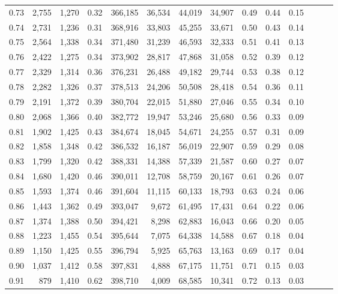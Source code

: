 \begin{tabular}{rrrrrrrrrrrrrr}
0.73 &  2,755 &  1,270 &  0.32 &  366,185 &   36,534 &  44,019 &  34,907 &  0.49 &  0.44 &      0.15 \\
0.74 &  2,731 &  1,236 &  0.31 &  368,916 &   33,803 &  45,255 &  33,671 &  0.50 &  0.43 &      0.14 \\
0.75 &  2,564 &  1,338 &  0.34 &  371,480 &   31,239 &  46,593 &  32,333 &  0.51 &  0.41 &      0.13 \\
0.76 &  2,422 &  1,275 &  0.34 &  373,902 &   28,817 &  47,868 &  31,058 &  0.52 &  0.39 &      0.12 \\
0.77 &  2,329 &  1,314 &  0.36 &  376,231 &   26,488 &  49,182 &  29,744 &  0.53 &  0.38 &      0.12 \\
0.78 &  2,282 &  1,326 &  0.37 &  378,513 &   24,206 &  50,508 &  28,418 &  0.54 &  0.36 &      0.11 \\
0.79 &  2,191 &  1,372 &  0.39 &  380,704 &   22,015 &  51,880 &  27,046 &  0.55 &  0.34 &      0.10 \\
0.80 &  2,068 &  1,366 &  0.40 &  382,772 &   19,947 &  53,246 &  25,680 &  0.56 &  0.33 &      0.09 \\
0.81 &  1,902 &  1,425 &  0.43 &  384,674 &   18,045 &  54,671 &  24,255 &  0.57 &  0.31 &      0.09 \\
0.82 &  1,858 &  1,348 &  0.42 &  386,532 &   16,187 &  56,019 &  22,907 &  0.59 &  0.29 &      0.08 \\
0.83 &  1,799 &  1,320 &  0.42 &  388,331 &   14,388 &  57,339 &  21,587 &  0.60 &  0.27 &      0.07 \\
0.84 &  1,680 &  1,420 &  0.46 &  390,011 &   12,708 &  58,759 &  20,167 &  0.61 &  0.26 &      0.07 \\
0.85 &  1,593 &  1,374 &  0.46 &  391,604 &   11,115 &  60,133 &  18,793 &  0.63 &  0.24 &      0.06 \\
0.86 &  1,443 &  1,362 &  0.49 &  393,047 &    9,672 &  61,495 &  17,431 &  0.64 &  0.22 &      0.06 \\
0.87 &  1,374 &  1,388 &  0.50 &  394,421 &    8,298 &  62,883 &  16,043 &  0.66 &  0.20 &      0.05 \\
0.88 &  1,223 &  1,455 &  0.54 &  395,644 &    7,075 &  64,338 &  14,588 &  0.67 &  0.18 &      0.04 \\
0.89 &  1,150 &  1,425 &  0.55 &  396,794 &    5,925 &  65,763 &  13,163 &  0.69 &  0.17 &      0.04 \\
0.90 &  1,037 &  1,412 &  0.58 &  397,831 &    4,888 &  67,175 &  11,751 &  0.71 &  0.15 &      0.03 \\
0.91 &    879 &  1,410 &  0.62 &  398,710 &    4,009 &  68,585 &  10,341 &  0.72 &  0.13 &      0.03 \\

\end{tabular}
